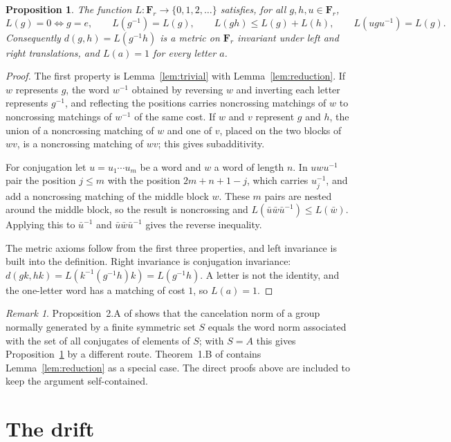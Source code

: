 \documentclass[11pt]{amsart}
\newtheorem{proposition}[theorem]{Proposition}
\theoremstyle{definition}
\theoremstyle{remark}
\newtheorem{remark}[theorem]{Remark}
\numberwithin{equation}{section}
\newcommand{\F}{\mathbf F}
\begin{document}
\begin{proposition}\label{prop:metric}
The function $L\colon\F_r\to\{0,1,2,\dots\}$ satisfies, for all $g,h,u\in\F_r$,
\[
L(g)=0\iff g=e,\qquad L(g^{-1})=L(g),\qquad L(gh)\le L(g)+L(h),\qquad L(ugu^{-1})=L(g).
\]
Consequently $d(g,h)=L(g^{-1}h)$ is a metric on $\F_r$ invariant under left and right translations, and $L(a)=1$ for every letter $a$.
\end{proposition}

\begin{proof}
The first property is Lemma~\ref{lem:trivial} with Lemma~\ref{lem:reduction}. If $w$ represents $g$, the word $w^{-1}$ obtained by reversing $w$ and inverting each letter represents $g^{-1}$, and reflecting the positions carries noncrossing matchings of $w$ to noncrossing matchings of $w^{-1}$ of the same cost. If $w$ and $v$ represent $g$ and $h$, the union of a noncrossing matching of $w$ and one of $v$, placed on the two blocks of $wv$, is a noncrossing matching of $wv$; this gives subadditivity.

For conjugation let $u=u_1\cdots u_m$ be a word and $w$ a word of length $n$. In $uwu^{-1}$ pair the position $j\le m$ with the position $2m+n+1-j$, which carries $u_j^{-1}$, and add a noncrossing matching of the middle block $w$. These $m$ pairs are nested around the middle block, so the result is noncrossing and $L(\bar u\bar w\bar u^{-1})\le L(\bar w)$. Applying this to $\bar u^{-1}$ and $\bar u\bar w\bar u^{-1}$ gives the reverse inequality.

The metric axioms follow from the first three properties, and left invariance is built into the definition. Right invariance is conjugation invariance: $d(gk,hk)=L(k^{-1}(g^{-1}h)k)=L(g^{-1}h)$. A letter is not the identity, and the one-letter word has a matching of cost $1$, so $L(a)=1$.
\end{proof}

\begin{remark}
Proposition~2.A of \cite{BGKM} shows that the cancelation norm of a group normally generated by a finite symmetric set $S$ equals the word norm associated with the set of all conjugates of elements of $S$; with $S=A$ this gives Proposition~\ref{prop:metric} by a different route. Theorem~1.B of \cite{BGKM} contains Lemma~\ref{lem:reduction} as a special case. The direct proofs above are included to keep the argument self-contained.
\end{remark}

\section{The drift}\label{sec:drift}
\end{document}

